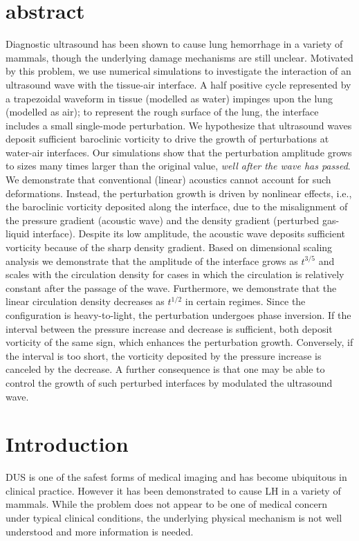 \section{abstract}
Diagnostic ultrasound has been shown to cause lung hemorrhage in a
variety of mammals, though the underlying damage mechanisms are still
unclear. Motivated by this problem, we use numerical simulations to
investigate the interaction of an ultrasound wave with the tissue-air
interface. A half positive cycle represented by a trapezoidal waveform
in tissue (modelled as water) impinges upon the lung (modelled as
air); to represent the rough surface of the lung, the interface
includes a small single-mode perturbation. We hypothesize that
ultrasound waves deposit sufficient baroclinic vorticity to drive the
growth of perturbations at water-air interfaces. Our simulations show
that the perturbation amplitude grows to sizes many times larger than
the original value, \emph{well after the wave has passed}. We
demonstrate that conventional (linear) acoustics cannot account for
such deformations. Instead, the perturbation growth is driven by
nonlinear effects, i.e., the baroclinic vorticity deposited along the
interface, due to the misalignment of the pressure gradient (acoustic
wave) and the density gradient (perturbed gas-liquid
interface). Despite its low amplitude, the acoustic wave deposits
sufficient vorticity because of the sharp density gradient. Based on
dimensional scaling analysis we demonstrate that the amplitude of the
interface grows as $t^{3/5}$ and scales with the circulation density
for cases in which the circulation is relatively constant after the
passage of the wave. Furthermore, we demonstrate that the linear
circulation density decreases as $t^{1/2}$ in certain regimes. Since
the configuration is heavy-to-light, the perturbation undergoes phase
inversion. If the interval between the pressure increase and decrease
is sufficient, both deposit vorticity of the same sign, which enhances
the perturbation growth. Conversely, if the interval is too short, the
vorticity deposited by the pressure increase is canceled by the
decrease. A further consequence is that one may be able to control the
growth of such perturbed interfaces by modulated the ultrasound wave.

\section{Introduction}%
\label{sec:introduction}%
\ac{DUS} is one of the safest forms of medical imaging and has become
ubiquitous in clinical practice. However it has been demonstrated to
cause \ac{LH} in a variety of mammals. While the problem does not
appear to be one of medical concern under typical clinical conditions,
the underlying physical mechanism is not well understood and more
information is needed. 

